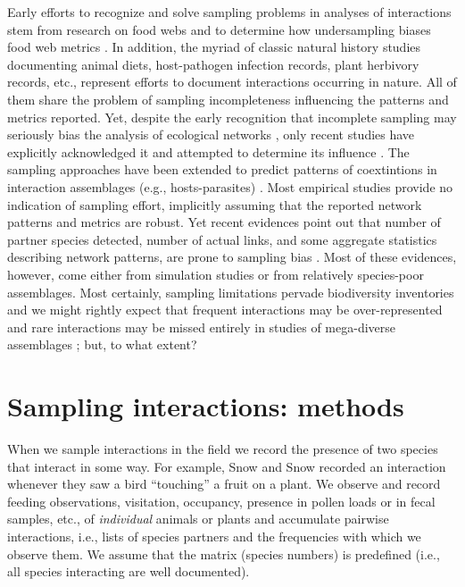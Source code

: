 \documentclass[12pt]{article}
\begin{document}
Early efforts to recognize and solve sampling problems in analyses of interactions stem from research on food webs and to determine how undersampling biases food web metrics \citep[][among others]{Martinez:1991aa,Cohen:1993aa,Wells:2012dy}. In addition, the myriad of classic natural history studies documenting animal diets, host-pathogen infection records, plant herbivory records, etc., represent efforts to document interactions occurring in nature. All of them share the problem of sampling incompleteness influencing the patterns and metrics reported. Yet, despite the early recognition that incomplete sampling may seriously bias the analysis of ecological networks \citep{E31/2562}, only recent studies have explicitly acknowledged it and attempted to determine its influence \citep{Ollerton:2002jw,Nielsen:2007,Vazquez:2009p82,Gibson:2011eh,Olesen:2011a,Chacoff:2012,RiveraHutinel:2012vn,Olito:2014gc,Bascompte:2014to,Vizentin-Bugoni:2014hc,Vizentin-Bugoni:2016aa,Frund:2015ii}. The sampling approaches have been extended to predict patterns of coextintions in interaction assemblages (e.g., hosts-parasites) \citep{Colwell:2012fc}. Most empirical studies provide no indication of sampling effort, implicitly assuming that the reported network patterns and metrics are robust. Yet recent evidences point out that number of partner species detected, number of actual links, and some aggregate statistics describing network patterns, are prone to sampling bias \citep{Nielsen:2007,Dorado:2011cf,Olesen:2011a,Chacoff:2012,RiveraHutinel:2012vn,Olito:2014gc,Frund:2015ii}. Most of these evidences, however, come either from simulation studies \citep{Frund:2015ii} or from relatively species-poor assemblages. Most certainly, sampling limitations pervade biodiversity inventories and we might rightly expect that frequent interactions may be over-represented and rare interactions may be missed entirely in studies of mega-diverse assemblages \citep{Bascompte:2014to}; but, to what extent? 

\section*{Sampling interactions: methods}
\label{samplinginteractions:methods}
When we sample interactions in the field we record the presence of two species that interact in some way. For example, Snow and Snow\citeyearpar{Snow:1988iu} recorded an interaction whenever they saw a bird ``touching'' a fruit on a plant. We observe and record feeding observations, visitation, occupancy, presence in pollen loads or in fecal samples, etc., of \emph{individual} animals or plants and accumulate pairwise interactions, i.e., lists of species partners and the frequencies with which we observe them. We assume that the matrix (species numbers) is predefined (i.e., all species interacting are well documented).
\end{document}
